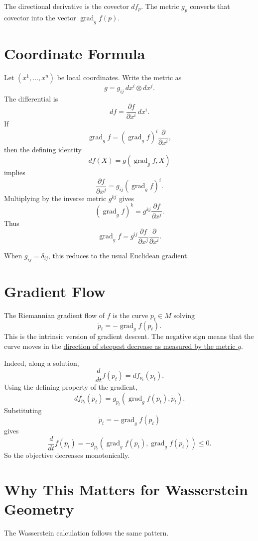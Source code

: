 \documentclass[11pt]{article}
\begin{document}
The directional derivative is the covector $df_p$. The metric $g_p$ converts
that covector into the vector $\operatorname{grad}_g f(p)$.

\section*{Coordinate Formula}

Let $(x^1,\ldots,x^n)$ be local coordinates. Write the metric as
\[
g
=
g_{ij}\,dx^i\otimes dx^j.
\]
The differential is
\[
df
=
\frac{\partial f}{\partial x^i}\,dx^i.
\]
If
\[
\operatorname{grad}_g f
=
(\operatorname{grad}_g f)^i\frac{\partial}{\partial x^i},
\]
then the defining identity
\[
df(X)=g(\operatorname{grad}_g f,X)
\]
implies
\[
\frac{\partial f}{\partial x^j}
=
g_{ij}(\operatorname{grad}_g f)^i.
\]
Multiplying by the inverse metric $g^{kj}$ gives
\[
(\operatorname{grad}_g f)^k
=
g^{kj}\frac{\partial f}{\partial x^j}.
\]
Thus
\[
\operatorname{grad}_g f
=
g^{ij}\frac{\partial f}{\partial x^j}
\frac{\partial}{\partial x^i}.
\]

When $g_{ij}=\delta_{ij}$, this reduces to the usual Euclidean gradient.

\section*{Gradient Flow}

The Riemannian gradient flow of $f$ is the curve $p_t\in M$ solving
\[
\dot p_t
=
-\operatorname{grad}_g f(p_t).
\]
This is the intrinsic version of gradient descent. The negative sign means
that the curve moves in the
\href{steepest_descent_metric.html}{direction of steepest decrease as measured
by the metric $g$}.

Indeed, along a solution,
\[
\frac{d}{dt}f(p_t)
=
df_{p_t}(\dot p_t).
\]
Using the defining property of the gradient,
\[
df_{p_t}(\dot p_t)
=
g_{p_t}(\operatorname{grad}_g f(p_t),\dot p_t).
\]
Substituting
\[
\dot p_t=-\operatorname{grad}_g f(p_t)
\]
gives
\[
\frac{d}{dt}f(p_t)
=
-g_{p_t}(\operatorname{grad}_g f(p_t),\operatorname{grad}_g f(p_t))
\le 0.
\]
So the objective decreases monotonically.

\section*{Why This Matters for Wasserstein Geometry}

The Wasserstein calculation follows the same pattern.
\end{document}
